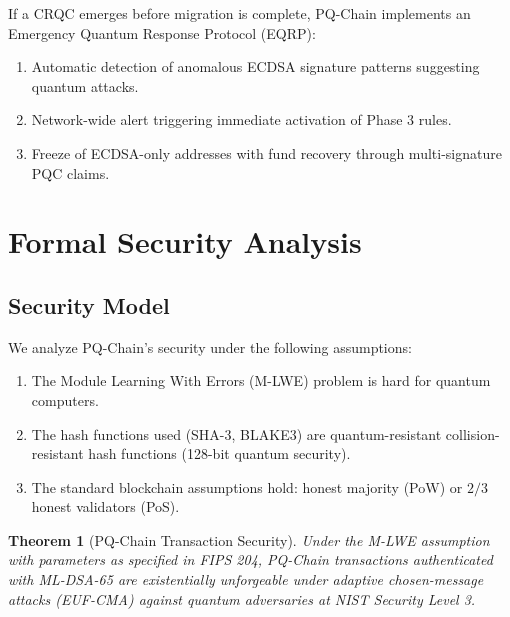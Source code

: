 \documentclass[12pt, a4paper, twocolumn]{article}
\newtheorem{theorem}{Theorem}
\begin{document}
If a CRQC emerges before migration is complete, PQ-Chain implements an Emergency Quantum Response Protocol (EQRP):

\begin{enumerate}[noitemsep]
  \item Automatic detection of anomalous ECDSA signature patterns suggesting quantum attacks.
  \item Network-wide alert triggering immediate activation of Phase 3 rules.
  \item Freeze of ECDSA-only addresses with fund recovery through multi-signature PQC claims.
\end{enumerate}

\section{Formal Security Analysis}
\label{sec:security}

\subsection{Security Model}

We analyze PQ-Chain's security under the following assumptions:

\begin{enumerate}[noitemsep]
  \item The Module Learning With Errors (M-LWE) problem is hard for quantum computers.
  \item The hash functions used (SHA-3, BLAKE3) are quantum-resistant collision-resistant hash functions (128-bit quantum security).
  \item The standard blockchain assumptions hold: honest majority (PoW) or $2/3$ honest validators (PoS).
\end{enumerate}

\begin{theorem}[PQ-Chain Transaction Security]
Under the M-LWE assumption with parameters as specified in FIPS 204, PQ-Chain transactions authenticated with ML-DSA-65 are existentially unforgeable under adaptive chosen-message attacks (EUF-CMA) against quantum adversaries at NIST Security Level 3.
\end{theorem}
\end{document}
